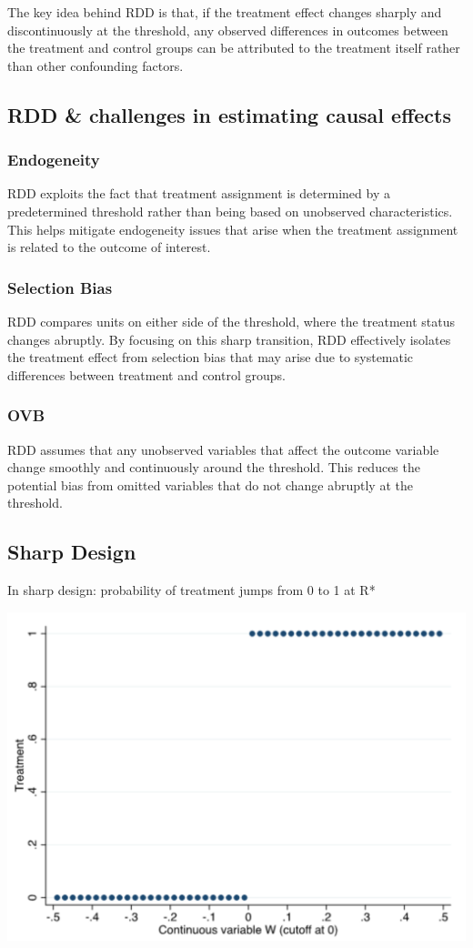 \documentclass[a3paper, 8pt]{extarticle}
\begin{document}
\begin{multicols*}{5}
The key idea behind RDD is that, if the treatment effect changes sharply and discontinuously at the threshold, any observed differences in outcomes between the treatment and control groups can be attributed to the treatment itself rather than other confounding factors.

\subsection{RDD \& challenges in estimating causal effects}

\subsubsection{Endogeneity} RDD exploits the fact that treatment assignment is determined by a predetermined threshold rather than being based on unobserved characteristics. This helps mitigate endogeneity issues that arise when the treatment assignment is related to the outcome of interest.
\subsubsection{Selection Bias} RDD compares units on either side of the threshold, where the treatment status changes abruptly. By focusing on this sharp transition, RDD effectively isolates the treatment effect from selection bias that may arise due to systematic differences between treatment and control groups.
\subsubsection{OVB} RDD assumes that any unobserved variables that affect the outcome variable change smoothly and continuously around the threshold. This reduces the potential bias from omitted variables that do not change abruptly at the threshold.

\subsection{Sharp Design}
In sharp design: probability of treatment jumps from 0 to 1 at R*

\includegraphics[width = \columnwidth]{Screen Shot 2023-05-30 at 14.30.35.png}


\end{multicols*}
\end{document}
